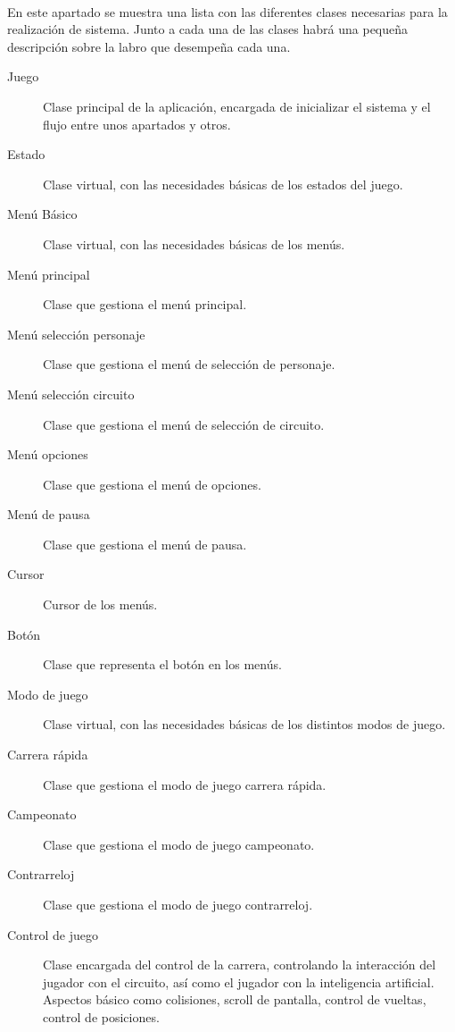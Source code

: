 \paragraph{}
En este apartado se muestra una lista con las diferentes clases necesarias para la realización de sistema. Junto a cada una de
las clases habrá una pequeña descripción sobre la labro que desempeña cada una.

\begin{description}
    \item [Juego] Clase principal de la aplicación, encargada de inicializar el sistema y el flujo entre unos apartados y otros.
    \item [Estado] Clase virtual, con las necesidades básicas de los estados del juego.
    
    \item [Menú Básico] Clase virtual, con las necesidades básicas de los menús.
    \item [Menú principal] Clase que gestiona el menú principal.
    \item [Menú selección personaje] Clase que gestiona el menú de selección de personaje.
    \item [Menú selección circuito] Clase que gestiona el menú de selección de circuito.
    \item [Menú opciones] Clase que gestiona el menú de opciones.
    \item [Menú de pausa] Clase que gestiona el menú de pausa.
    \item [Cursor] Cursor de los menús.
    \item [Botón] Clase que representa el botón en los menús.
    
    \item [Modo de juego] Clase virtual, con las necesidades básicas de los distintos modos de juego.
    \item [Carrera rápida] Clase que gestiona el modo de juego carrera rápida.
    \item [Campeonato] Clase que gestiona el modo de juego campeonato.
    \item [Contrarreloj] Clase que gestiona el modo de juego contrarreloj.
    
    \item [Control de juego] Clase encargada del control de la carrera, controlando la interacción del jugador con el circuito, así 
    como el jugador con la inteligencia artificial. Aspectos básico como colisiones, scroll de pantalla, control de vueltas, control
    de posiciones.
    

\end{description}
